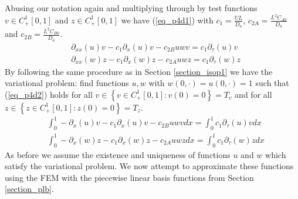 \documentclass[11pt,fleqn]{article}
\theoremstyle{defstyle}
\begin{document}
Abusing our notation again and multiplying through by test functions $v \in C^1_+[0,1]$ and $z \in C^1_+[0,1]$ we have (\ref{eq_p4d1}) with $c_1 = \frac{UL}{D_a}$,  $c_{2A} = \frac{L^2C_{A0}}{D_a}$ and  $c_{2B} = \frac{L^2C_{B0}}{D_a}$.
\begin{equation}
\begin{aligned}
&\partial_{xx}(u)v - c_1\partial_x(u)v - c_{2B}uwv = c_1\partial_\tau(u)v \\
&\partial_{xx}(w)z - c_1\partial_x(w)z - c_{2A}uwz = c_1\partial_\tau(w)z 
\end{aligned}
\label{eq_p4d1}
\end{equation}
By following the same procedure as in Section \ref{section_isop1} we have the variational problem: find functions $u, w$ with $w(0,\cdot)=u(0,\cdot)=1$ such that (\ref{eq_p4d2}) holds for all $v \in \left\{v \in  C^1_+[0,1] : v(0) = 0 \right\} = T_v$ and for all $z \in \left\{z \in  C^1_+[0,1] : z(0) = 0 \right\} = T_z$.
\begin{equation}
\begin{aligned}
&\int_0^1 -\partial_{x}(u)v - c_1\partial_x(u)v - c_{2B}uwvdx = \int_0^1 c_1\partial_\tau(u)v dx \\
&\int_0^1-\partial_{x}(w)z - c_1\partial_x(w)z - c_{2A}uwzdx = \int_0^1 c_1\partial_\tau(w)zdx 
\end{aligned}
\label{eq_p4d2}
\end{equation}
As before we assume the existence and uniqueness of functions $u$ and $w$ which satisfy the variational problem. We now attempt to approximate these functions using the FEM with the piecewise linear basis functions from Section \ref{section_plb}. 
\end{document}
